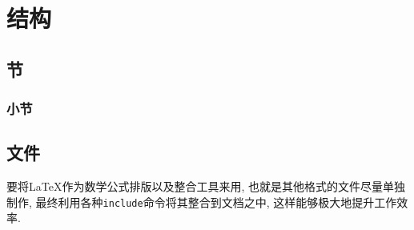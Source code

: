 \chapter{结构}

\section{节}

\subsection{小节}

\section{文件}

要将\LaTeX{}作为数学公式排版以及整合工具来用, 也就是其他格式的文件尽量单独制作,
最终利用各种\texttt{include}命令将其整合到文档之中, 这样能够极大地提升工作效率.
